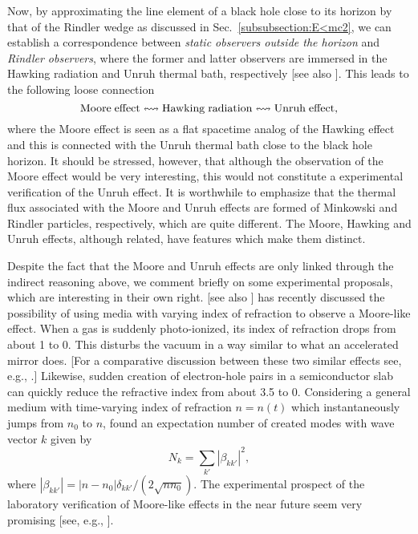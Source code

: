 \documentclass[12pt,nofootinbib,floatfix,aps,prd,showpacs,amsmath,amssymb,eqsecnum]{revtex4-2}
\begin{document}
Now, by approximating the line element of a black hole 
close to its horizon by that of the Rindler wedge as discussed 
in Sec.~\ref{subsubsection:E<mc2}, we can establish a correspondence
between {\em static observers outside the horizon} and {\em Rindler 
observers}, where the former and latter observers
are immersed in the Hawking 
radiation and Unruh thermal bath, respectively 
[see also \textcite{Ginzburgetal87}]. 
This leads to the following loose connection
$$
{\rm Moore} \; {\rm effect} \leftrightsquigarrow 
{\rm Hawking} \; {\rm radiation} \leftrightsquigarrow
{\rm Unruh} \; {\rm effect},
$$
where the Moore effect is seen as a flat spacetime analog of 
the Hawking effect and this is connected with the Unruh thermal
bath close to the black hole horizon. It should be stressed, however, 
that although the observation  of the Moore effect would
be very interesting, this would not constitute a experimental
verification of the Unruh effect. It is worthwhile to emphasize 
that the thermal flux associated with the Moore and Unruh effects are 
formed of Minkowski and Rindler particles, respectively, which are 
quite different. The Moore, Hawking and Unruh effects, although 
related, have features which make them distinct.

Despite the fact that the Moore and Unruh effects are only linked 
through the indirect reasoning above, we comment briefly on 
some experimental proposals, which are interesting in their own right.
\textcite{Yablonovitch89} [see also \textcite{Yablonovitchetal89}] has 
recently discussed the possibility of using media with varying index of 
refraction to observe a Moore-like effect. When a gas is suddenly 
photo-ionized, its index of refraction drops from about 1 to 0. 
This disturbs the vacuum in a way similar to what 
an accelerated mirror does.
[For a comparative discussion between these two similar effects see, e.g., 
\textcite{Johnstonetal95}.]  Likewise, sudden creation of electron-hole 
pairs in a semiconductor slab can quickly reduce the refractive index 
from about 3.5 to 0. 
Considering a general medium with time-varying index of refraction 
$n=n(t)$ which instantaneously jumps from  $n_0$ to $n$,
\textcite{Yablonovitch89}
found an expectation number of created modes with wave vector $k$ given by
$$
N_k =  \sum_{k'} |\beta_{k {k'}}|^2,
$$
where
$
 |\beta_{k {k'}}| = |n-n_0| \delta_{k {k'}}/(2 \sqrt{n n_0})
$.
The experimental prospect of the laboratory verification of 
Moore-like effects in the near future seem very promising [see, 
e.g., \cite{Kimetal06,Uhlmannetal04}].
\end{document}
